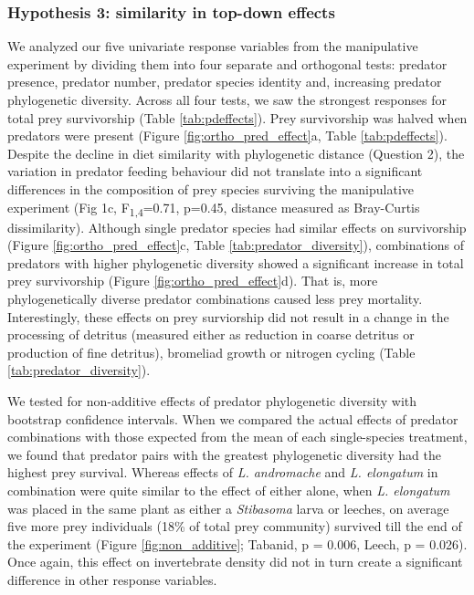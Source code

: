\subsubsection{Hypothesis 3: similarity in top-down
effects}\label{hypothesis-3-similarity-in-top-down-effects}

We analyzed our five univariate response variables from the manipulative
experiment by dividing them into four separate and orthogonal tests:
predator presence, predator number, predator species identity and,
increasing predator phylogenetic diversity. Across all four tests, we
saw the strongest responses for total prey survivorship (Table \ref{tab:pdeffects}). Prey
survivorship was halved when predators were present (Figure \ref{fig:ortho_pred_effect}a, Table \ref{tab:pdeffects}). Despite the decline in diet similarity with phylogenetic distance
(Question 2), the variation in predator feeding behaviour did not
translate into a significant differences in the composition of prey
species surviving the manipulative experiment (Fig 1c,
F\textsubscript{1,4}=0.71, p=0.45, distance measured as Bray-Curtis
dissimilarity). Although single predator species had similar effects on
survivorship (Figure \ref{fig:ortho_pred_effect}c, Table \ref{tab:predator_diversity}), combinations of predators with higher
phylogenetic diversity showed a significant increase in total prey
survivorship (Figure \ref{fig:ortho_pred_effect}d). That is, more phylogenetically diverse predator
combinations caused less prey mortality. Interestingly, these effects on
prey surviorship did not result in a change in the processing of
detritus (measured either as reduction in coarse detritus or production
of fine detritus), bromeliad growth or nitrogen cycling (Table \ref{tab:predator_diversity}).

We tested for non-additive effects of predator phylogenetic diversity
with bootstrap confidence intervals. When we compared the actual effects
of predator combinations with those expected from the mean of each
single-species treatment, we found that predator pairs with the greatest
phylogenetic diversity had the highest prey survival. Whereas effects of
\emph{L. andromache} and \emph{L. elongatum} in combination were quite
similar to the effect of either alone, when \emph{L. elongatum} was
placed in the same plant as either a \emph{Stibasoma} larva or leeches,
on average five more prey individuals (18\% of total prey community)
survived till the end of the experiment (Figure \ref{fig:non_additive}; Tabanid, p = 0.006,
Leech, p = 0.026). Once again, this effect on invertebrate density did
not in turn create a significant difference in other response variables.

